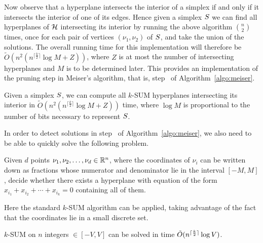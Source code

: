 Now observe that a hyperplane intersects the interior of a simplex if and only
if it intersects the interior of one of its edges. Hence given a simplex
$S$ we can find all hyperplanes of $\mathcal{H}$ intersecting its interior by
running the above algorithm ${n\choose 2}$ times, once for each pair of
vertices $(\nu_1,\nu_2)$ of $S$, and take the union of the solutions.
The overall running time for this implementation will therefore be
$\tilde{O}(n^2 (n^{\lceil \frac k2 \rceil} \log M + Z))$, where $Z$ is at most the
number of intersecting hyperplanes and $M$ is to be determined later.
This provides an implementation of the pruning step in Meiser's algorithm, that
is, step~ of Algorithm~\ref{algo:meiser}.

\begin{corollary}\label{cor:double}
	Given a simplex $S$, we can compute all $k$-SUM hyperplanes
	intersecting its interior in $\tilde{O}(n^2 (n^{\lceil \frac k2 \rceil}
	\log M + Z))$ time, where $\log M$ is proportional to the number of bits
	necessary to represent $S$.
\end{corollary}

In order to detect solutions in step~ of Algorithm~\ref{algo:meiser}, we also
need to be able to quickly solve the following problem.
\begin{problem}
	Given $d$ points $\nu_1,\nu_2,\ldots,\nu_d \in \mathbb{R}^n$, where the coordinates of
	$\nu_i$ can be written down as fractions whose numerator and denominator
	lie in the interval $[-M,M]$,
	decide whether there exists a hyperplane with equation of the form $x_{i_1}
	+ x_{i_2} + \cdots + x_{i_k} = 0$ containing all of them.
\end{problem}

Here the standard $k$-SUM algorithm can be applied, taking advantage of
the fact that the coordinates lie in a small discrete set.
\begin{lemma}\label{lem:ksum}
	$k$-SUM on $n$ integers $\in [-V,V]$ can be solved in time
	$\tilde{O}(n^{{\lceil\frac{k}{2} \rceil}}\log V)$.
\end{lemma}

